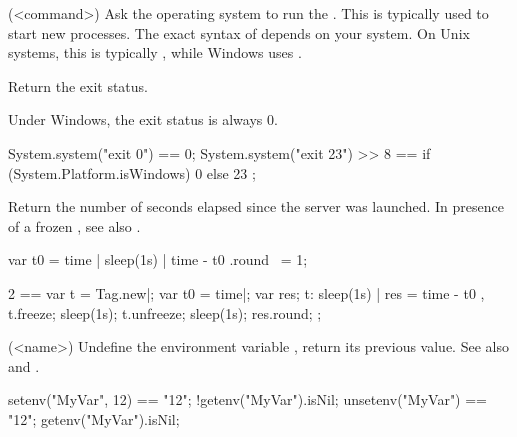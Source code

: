 \begin{urbiscriptapi}


\item[system](<command>)%
  Ask the operating system to run the .  This is
  typically used to start new processes.  The exact syntax of
   depends on your system.  On Unix systems, this is
  typically , while Windows uses .

  Return the exit status.

  \begin{windows}
    Under Windows, the exit status is always 0.
  \end{windows}

\begin{urbiassert}
System.system("exit 0") == 0;
System.system("exit 23") >> 8
       == { if (System.Platform.isWindows) 0 else 23 };
\end{urbiassert}


\item[time] Return the number of seconds elapsed since the \urbi
  server was launched.  In presence of a frozen , see
  also .
\begin{urbiassert}
{ var t0 = time | sleep(1s) | time - t0 }.round ~= 1;

  2 ==
  {
    var t = Tag.new|;
    var t0 = time|;
    var res;
    t: { sleep(1s) | res = time - t0 },
    t.freeze;
    sleep(1s);
    t.unfreeze;
    sleep(1s);
    res.round;
  };
\end{urbiassert}


\item[unsetenv](<name>)%
  Undefine the environment variable , return its previous value.
  See also  and .

\begin{urbiassert}
setenv("MyVar", 12) == "12";
!getenv("MyVar").isNil;
unsetenv("MyVar") == "12";
getenv("MyVar").isNil;
\end{urbiassert}


\end{urbiscriptapi}

